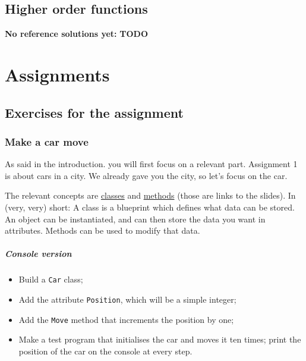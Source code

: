     \section{Higher order functions}
        \textbf{No reference solutions yet:}
        \textbf{TODO}

\chapter{Assignments}
\section{Exercises for the assignment}
    \subsection{Make a car move}
        As said in the introduction. you will first focus on a relevant part.
        Assignment 1 is about cars in a city.
        We already gave you the city, so let's focus on the car.

        The relevant concepts are \href{https://github.com/hogeschool/INFDEV02-2/raw/master/Slides/Lecture%20I%20-%20data%20structures.pdf}{classes} and \href{https://github.com/hogeschool/INFDEV02-2/raw/master/Slides/Lecture%20V%20-%20methods.pdf}{methods} (those are links to the slides).
            In (very, very) short: A class is a blueprint which defines what data can be stored.
            An object can be instantiated, and can then store the data you want in attributes.
            Methods can be used to modify that data.

        \paragraph*{Console version}
        \begin{itemize}
            \item Build a \texttt{Car} class;
            \item Add the attribute \texttt{Position}, which will be a simple integer;
            \item Add the \texttt{Move} method that increments the position by one;
            \item Make a test program that initialises the car and moves it ten times; print the position of the car on the console at every step.
        \end{itemize}


